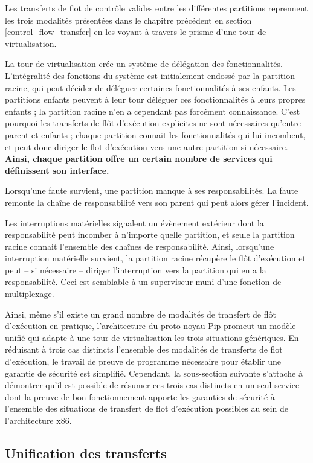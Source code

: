 	Les transferts de flot de contrôle valides entre les différentes partitions reprennent les trois modalités présentées dans le chapitre précédent en section \ref{control_flow_transfer} en les voyant à travers le prisme d'une tour de virtualisation.

	La tour de virtualisation crée un système de délégation des fonctionnalités. L'intégralité des fonctions du système est initialement endossé par la partition racine, qui peut décider de déléguer certaines fonctionnalités à ses enfants. Les partitions enfants peuvent à leur tour déléguer ces fonctionnalités à leurs propres enfants ; la partition racine n'en a cependant pas forcément connaissance. C'est pourquoi les transferts de flôt d'exécution explicites ne sont nécessaires qu'entre parent et enfants ; chaque partition connait les fonctionnalités qui lui incombent, et peut donc diriger le flot d'exécution vers une autre partition si nécessaire. \textbf{Ainsi, chaque partition offre un certain nombre de services qui définissent son interface.}

	Lorsqu'une faute survient, une partition manque à ses responsabilités. La faute remonte la chaîne de responsabilité vers son parent qui peut alors gérer l'incident.

	Les interruptions matérielles signalent un évènement extérieur dont la responsabilité peut incomber à n'importe quelle partition, et seule la partition racine connait l'ensemble des chaînes de responsabilité. Ainsi, lorsqu'une interruption matérielle survient, la partition racine récupère le flôt d'exécution et peut -- si nécessaire -- diriger l'interruption vers la partition qui en a la responsabilité. Ceci est semblable à un superviseur muni d'une fonction de multiplexage.

Ainsi, même s'il existe un grand nombre de modalités de transfert de flôt d'exécution en pratique, l'architecture du proto-noyau Pip promeut un modèle unifié qui adapte à une tour de virtualisation les trois situations génériques. En réduisant à trois cas distincts l'ensemble des modalités de transferts de flot d'exécution, le travail de preuve de programme nécessaire pour établir une garantie de sécurité est simplifié. Cependant, la sous-section suivante s'attache à démontrer qu'il est possible de résumer ces trois cas distincts en un seul service dont la preuve de bon fonctionnement apporte les garanties de sécurité à l'ensemble des situations de transfert de flot d'exécution possibles au sein de l'architecture x86.

	\subsection{Unification des transferts}
	\label{unification}

